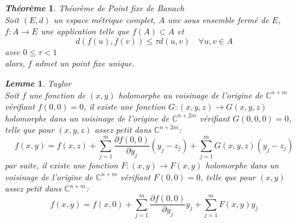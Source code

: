 \documentclass[12pt,a4paper]{report}
\theoremstyle{plain}
\newtheorem{theo}{\textit{Théorème}}[chapter]
\newtheorem{lem}{\textit{Lemme}}[chapter]
\theoremstyle{definition}
\theoremstyle{remark}
\newcommand{\Cnm}{\ensuremath{\mathbb{C}^{n+m}}}
\newcommand{\Cnmm}{\ensuremath{\mathbb{C}^{n+2m}}}
\begin{document}
\begin{theo}\cite{dema}{Théorème de Point fixe de Banach}\label{banachfp}\\
Soit $ (E, d)$ un espace métrique complet, $A$  une sous ensemble fermé de $E$, $f:A \rightarrow E$ une application telle que $ f(A) \subset A$ et 
$$ d( f(u),f(v)) \leq \tau d(u,v) \quad \forall u,v \in A $$
avec $0\leq \tau <1$\\
alors, $f$ admet un point fixe unique.
\end{theo}



\begin{lem} \cite{chant} {Taylor} \label{taylor1} \\
Soit $f$ une fonction de $(x,y)$ holomorphe au voisinage de l'origine de $\Cnm$ vérifiant $f(0,0)=0$, il existe une fonction $G:(x,y,z) \rightarrow G(x,y,z)$ holomorphe dans un voisinage de l'origine de $\Cnmm$ vérifiant $G(0,0,0)=0$, telle que pour $(x,y,z)$ assez petit dans $\Cnmm$:
$$ f(x,y)=f(x,z)+\sum_{j=1}^m \frac{\partial f(0,0)}{\partial y_j}(y_j-z_j) +\sum_{j=1}^m G(x,y,z) (y_j-z_j)$$
par suite, il existe une fonction $F:(x,y)\rightarrow F(x,y)$ holomorphe dans un voisinage de l'origine de $\Cnm$ vérifiant $F(0,0)=0$, telle que pour $(x,y)$ assez petit dans $\Cnm$: 
$$ f(x,y)=f(x,0)+\sum_{j=1}^m \frac{\partial f(0,0)}{\partial y_j}y_j +\sum_{j=1}^m F(x,y)y_j$$
\end{lem}
\end{document}
